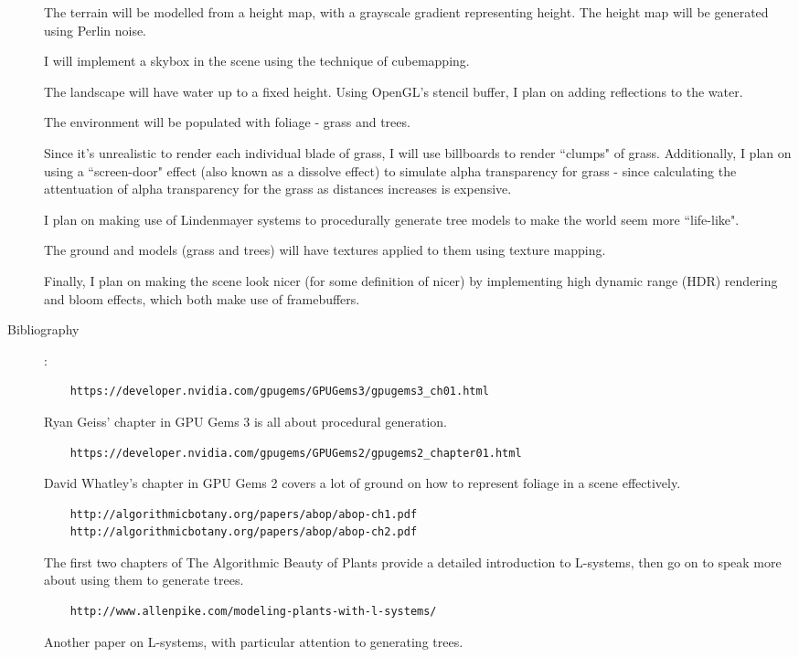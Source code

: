 \documentclass {article}
\begin{document}
\begin{description}
    The terrain will be modelled from a height map, with a grayscale gradient representing height. The height map will be generated using Perlin noise.

    I will implement a skybox in the scene using the technique of cubemapping.

    The landscape will have water up to a fixed height. Using OpenGL's stencil buffer, I plan on adding reflections to the water.

    The environment will be populated with foliage - grass and trees. 

    Since it's unrealistic to render each individual blade of grass, I will use billboards to render ``clumps" of grass. Additionally, I plan on using a ``screen-door" effect (also known as a dissolve effect) to simulate alpha transparency for grass - since calculating the attentuation of alpha transparency for the grass as distances increases is expensive.

    I plan on making use of Lindenmayer systems to procedurally generate tree models to make the world seem more ``life-like".

    The ground and models (grass and trees) will have textures applied to them using texture mapping. 

    Finally, I plan on making the scene look nicer (for some definition of nicer) by implementing high dynamic range (HDR) rendering and bloom effects, which both make use of framebuffers.

\item[Bibliography]:\\

    \begin{verbatim}
    https://developer.nvidia.com/gpugems/GPUGems3/gpugems3_ch01.html
    \end{verbatim}
    Ryan Geiss' chapter in GPU Gems 3 is all about procedural generation.

    \begin{verbatim}
    https://developer.nvidia.com/gpugems/GPUGems2/gpugems2_chapter01.html
    \end{verbatim}
    David Whatley's chapter in GPU Gems 2 covers a lot of ground on how to represent foliage in a scene effectively.

    \begin{verbatim}
    http://algorithmicbotany.org/papers/abop/abop-ch1.pdf
    http://algorithmicbotany.org/papers/abop/abop-ch2.pdf
    \end{verbatim}
    The first two chapters of The Algorithmic Beauty of Plants provide a detailed introduction to L-systems, then go on to speak more about using them to generate trees.

    \begin{verbatim}
    http://www.allenpike.com/modeling-plants-with-l-systems/
    \end{verbatim}
    Another paper on L-systems, with particular attention to generating trees.

\end{description}
\newpage
\end{document}
